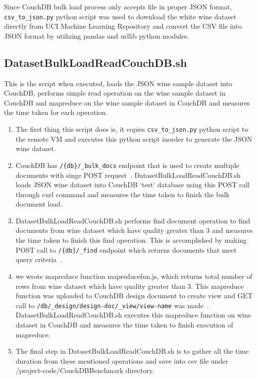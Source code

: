 Since CouchDB bulk load process only accepts file in proper JSON
format, \verb|csv_to_json.py| python script was used to
download the white wine dataset directly from UCI Machine Learning
Repository and convert the CSV file into JSON format by utilizing
pandas and urllib python modules.

\subsection{DatasetBulkLoadReadCouchDB.sh}
This is the script when executed, loads the JSON wine sample dataset
into CouchDB, performs simple read operation on the wine sample
dataset in CouchDB and mapreduce on the wine sample
dataset in CouchDB and measures the time taken for each operation.

\begin{enumerate}
  \item The first thing this script does is, it copies \verb|csv_to_json.py|
python script to the remote VM and executes this python script inorder
to generate the JSON wine dataset.
  \item CouchDB has \verb|/{db}/_bulk_docs|
endpoint that is used to create multiple documents with singe POST
request~\cite{www-CouchdbBulkApi}. DatasetBulkLoadReadCouchDB.sh loads JSON wine dataset
into CouchDB  `test` database using this POST call through curl command
and measures the time taken to finish the bulk document load.

  \item DatasetBulkLoadReadCouchDB.sh performs find document operation to find documents
from wine dataset which have quality greater than 3 and measures the time taken to finish this find
operation. This is accomplished by making POST call to
\verb|/{db}/_find| endpoint which returns documents that meet query criteria~\cite{www-CouchdbFind}.

  \item we wrote mapreduce function mapreducefun.js, which returns
    total number of rows from wine dataset which have quality greater than 3. This mapreduce
    function was uploaded to CouchDB design document to create view and GET call to
    \verb|/db/_design/design-doc/_view/view-name| was
    made~\cite{www-CouchdbView}. DatasetBulkLoadReadCouchDB.sh
    executes this mapreduce function on wine dataset in CouchDB and
    measures the time taken to finish execution of mapreduce.
  \item The final step in DatasetBulkLoadReadCouchDB.sh is to gather
    all the time duration from these mentioned operations and save
    into csv file under /project-code/CouchDBBenchmark directory.

\end{enumerate}

